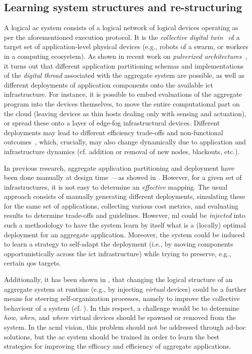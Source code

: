 \subsection{Learning system structures and re-structuring}
A logical \ac{ac} system 
 consists of a logical network
 of logical devices
 operating as per the aforementioned execution protocol.
%
It is the \emph{collective digital twin}~\cite{casadei2022applsci}
 of a target set of application-level physical devices (e.g., robots of a swarm, or workers in a computing ecosystem).
%
As shown in recent work on \emph{pulverized architectures}~\cite{DBLP:journals/fi/CasadeiPPVW20},
 it turns out that different application partitioning schemas and implementations of the \emph{digital thread} associated with the aggregate system are possible,
 as well as different deployments
 of application components
 onto the available \ac{ict} infrastructure.
%
%
For instance,
 it is possible to embed evaluations of the aggregate program into the devices themselves,
 to move the entire computational part on the cloud (leaving devices as thin hosts dealing only with sensing and actuation),
 or spread these onto a layer of edge-fog infrastructural devices.
%
Different deployments 
 may lead to different efficiency trade-offs
 and non-functional outcomes~\cite{DBLP:journals/fi/CasadeiPPVW20,casadei2022applsci},
 which, crucially, may also change dynamically 
 due to application and infrastructure dynamics
 (cf. addition or removal of new nodes, blackouts, etc.).
 

In previous research, aggregate application partitioning and deployment have been done manually at design time~\cite{DBLP:journals/fi/CasadeiPPVW20}---as showed in .
%
However, for a given set of infrastructures, it is not easy to determine an \emph{effective} mapping.
%
The usual approach consists of manually generating different deployments,
 simulating these for the same set of applications,
 collecting various cost metrics,
 and evaluating results to determine trade-offs and guidelines.
%
However, \ac{ml} could be \emph{injected} into 
 such a methodology
 to have the system learn by itself what is a
 (locally) optimal deployment for an aggregate application.
% 
Moreover, the system could be induced to learn a strategy to self-adapt the deployment (i.e., by moving components opportunistically across the \ac{ict} infrastructure) 
 while trying to preserve, e.g., certain \ac{qos} targets.
 
Additionally,
 it has been shown in \cite{casadei2022applsci},
 that changing the logical structure of an aggregate system at runtime
 (e.g., by injecting \emph{virtual} devices)
 could be a further means 
 for steering self-organization processes,
 namely to improve the collective behaviour of a system (cf. \cite{DBLP:journals/jnca/LiS11}).
%
In this respect,
 a challenge would be to determine
 \emph{how}, \emph{when}, and \emph{where} 
 virtual devices
 should be spawned or removed
 from the system.
%
In the \ac{acml} vision,
 this problem should not be addressed
 through ad-hoc solutions,
 but the \ac{ac} system should be trained
 in order to learn the best strategies
 for improving the efficacy and efficiency
 of aggregate applications.
